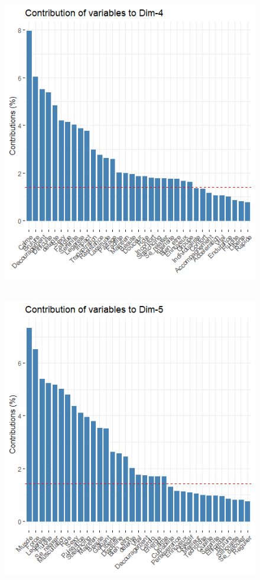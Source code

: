 \documentclass[12pt]{article}
\begin{document}
\begin{figure}[H]
\begin{center}
\includegraphics[scale=1.3]{ACP_5.png} 
\caption[]{\ }
\end{center}
\end{figure}


\begin{figure}[H]
\begin{center}
\includegraphics[scale=1.3]{ACP_6.png} 
\caption[]{\ }
\end{center}
\end{figure}
\end{document}
